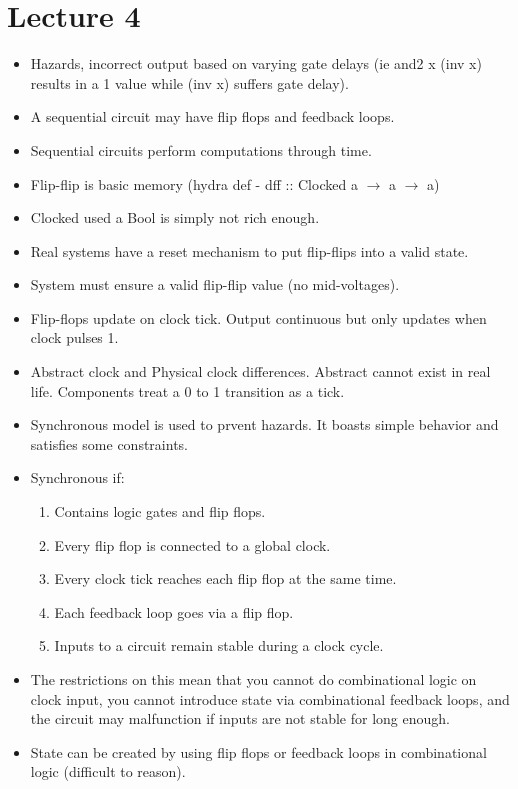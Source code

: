 \documentclass{article}
\begin{document}
\section*{Lecture 4}
\begin{itemize}
\item Hazards, incorrect output based on varying gate delays (ie and2 x (inv x) results in a 1 value while (inv x) suffers gate delay).
\item A sequential circuit may have flip flops and feedback loops.
\item Sequential circuits perform computations through time.
\item Flip-flip is basic memory (hydra def - dff :: Clocked a $\rightarrow$ a $\rightarrow$ a)
\item Clocked used a Bool is simply not rich enough.
\item Real systems have a reset mechanism to put flip-flips into a valid state.
\item System must ensure a valid flip-flip value (no mid-voltages).
\item Flip-flops update on clock tick. Output continuous but only updates when clock pulses 1.
\item Abstract clock and Physical clock differences. Abstract cannot exist in real life. Components treat a 0 to 1 transition as a tick.
\item Synchronous model is used to prvent hazards. It boasts simple behavior and satisfies some constraints.
\item Synchronous if:
\begin{enumerate}
\item Contains logic gates and flip flops.
\item Every flip flop is connected to a global clock.
\item Every clock tick reaches each flip flop at the same time.
\item Each feedback loop goes via a flip flop.
\item Inputs to a circuit remain stable during a clock cycle.
\end{enumerate}
\item The restrictions on this mean that you cannot do combinational logic on clock input, you cannot introduce state via combinational feedback loops, and the circuit may malfunction if inputs are not stable for long enough.
\item State can be created by using flip flops or feedback loops in combinational logic (difficult to reason).

\end{itemize}
\end{document}
